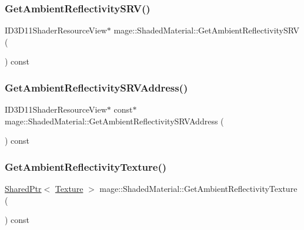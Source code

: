\subsubsection{\texorpdfstring{Get\+Ambient\+Reflectivity\+S\+R\+V()}{GetAmbientReflectivitySRV()}}
{\footnotesize\ttfamily I\+D3\+D11\+Shader\+Resource\+View$\ast$ mage\+::\+Shaded\+Material\+::\+Get\+Ambient\+Reflectivity\+S\+RV (\begin{DoxyParamCaption}{ }\end{DoxyParamCaption}) const\hspace{0.3cm}{\ttfamily [noexcept]}}

\hypertarget{structmage_1_1_shaded_material_a854b166ed33ab748910d98a0ea6bd4d1}{}\label{structmage_1_1_shaded_material_a854b166ed33ab748910d98a0ea6bd4d1} 
\subsubsection{\texorpdfstring{Get\+Ambient\+Reflectivity\+S\+R\+V\+Address()}{GetAmbientReflectivitySRVAddress()}}
{\footnotesize\ttfamily I\+D3\+D11\+Shader\+Resource\+View$\ast$ const$\ast$ mage\+::\+Shaded\+Material\+::\+Get\+Ambient\+Reflectivity\+S\+R\+V\+Address (\begin{DoxyParamCaption}{ }\end{DoxyParamCaption}) const\hspace{0.3cm}{\ttfamily [noexcept]}}

\hypertarget{structmage_1_1_shaded_material_a66be8b4fbb028b41483f8a9e044e5023}{}\label{structmage_1_1_shaded_material_a66be8b4fbb028b41483f8a9e044e5023} 
\subsubsection{\texorpdfstring{Get\+Ambient\+Reflectivity\+Texture()}{GetAmbientReflectivityTexture()}}
{\footnotesize\ttfamily \hyperlink{namespacemage_a1e01ae66713838a7a67d30e44c67703e}{Shared\+Ptr}$<$ \hyperlink{classmage_1_1_texture}{Texture} $>$ mage\+::\+Shaded\+Material\+::\+Get\+Ambient\+Reflectivity\+Texture (\begin{DoxyParamCaption}{ }\end{DoxyParamCaption}) const\hspace{0.3cm}{\ttfamily [noexcept]}}


